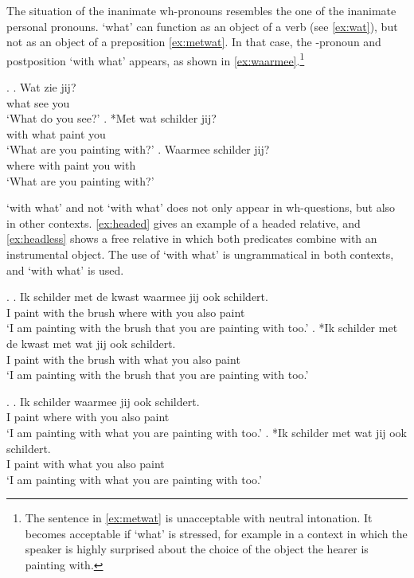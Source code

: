 \documentclass[12pt]{article}
\begin{document}
The situation of the inanimate wh-pronouns resembles the one of the inanimate personal pronouns.  `what' can function as an object of a verb (see \ref{ex:wat}), but not as an object of a preposition \ref{ex:metwat}. In that case, the -pronoun and postposition  `with what' appears, as shown in \ref{ex:waarmee}.\footnote{The sentence in \ref{ex:metwat} is unacceptable with neutral intonation. It becomes acceptable if  `what' is stressed, for example in a context in which the speaker is highly surprised about the choice of the object the hearer is painting with.}

\ex.
\ag. Wat zie jij?\\
 what see you\\
 `What do you see?'\label{ex:wat}
\bg. *Met wat schilder jij?\\
 with what paint you\\
 `What are you painting with?'\label{ex:metwat}
\bg. Waarmee schilder jij?\\
 {where with} paint you with\\
 `What are you painting with?'\label{ex:waarmee}

 `with what' and not  `with what' does not only appear in wh-questions, but also in other contexts. \ref{ex:headed} gives an example of a headed relative, and \ref{ex:headless} shows a free relative in which both predicates combine with an instrumental object. The use of  `with what' is ungrammatical in both contexts, and  `with what' is used.

\ex.\label{ex:headed}
\ag. Ik schilder met de kwast waarmee jij ook schildert.\\
 I paint with the brush {where with} you also paint\\
 `I am painting with the brush that you are painting with too.'
\bg. *Ik schilder met de kwast met wat jij ook schildert.\\
 I paint with the brush with what you also paint\\
 `I am painting with the brush that you are painting with too.'

 \ex.\label{ex:headless}
 \ag. Ik schilder waarmee jij ook schildert.\\
  I paint {where with} you also paint\\
  `I am painting with what you are painting with too.'
 \bg. *Ik schilder met wat jij ook schildert.\\
  I paint with what you also paint\\
  `I am painting with what you are painting with too.'
\end{document}
